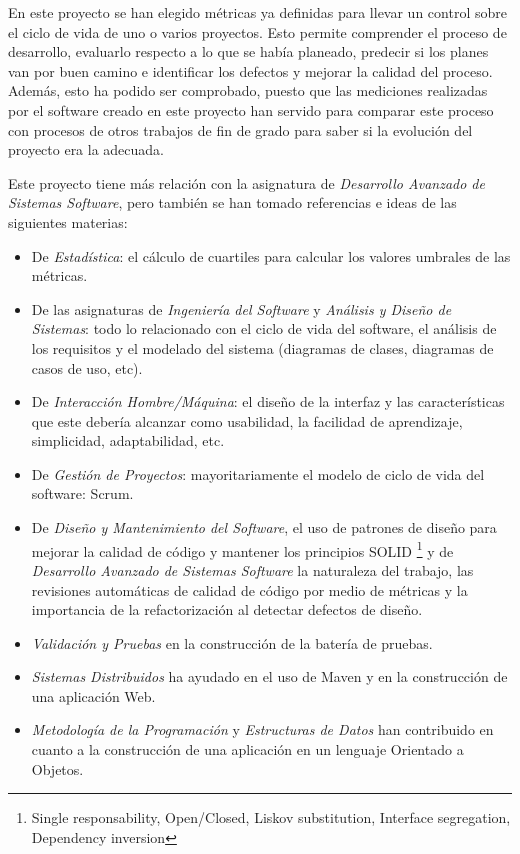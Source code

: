 En este proyecto se han elegido métricas ya definidas para llevar un control sobre el ciclo de vida de uno o varios proyectos. Esto permite comprender el proceso de desarrollo, evaluarlo respecto a lo que se había planeado, predecir si los planes van por buen camino e identificar los defectos y mejorar la calidad del proceso. Además, esto ha podido ser comprobado, puesto que las mediciones realizadas por el software creado en este proyecto han servido para comparar este proceso con procesos de otros trabajos de fin de grado para saber si la evolución del proyecto era la adecuada.

Este proyecto tiene más relación con la asignatura de \textit{Desarrollo Avanzado de Sistemas Software}, pero también se han tomado referencias e ideas de las siguientes materias: 
\begin{itemize}
	\tightlist
	\item De \textit{Estadística}: el cálculo de cuartiles para calcular los valores umbrales de las métricas.
	\item De las asignaturas de \textit{Ingeniería del Software} y \textit{Análisis y Diseño de Sistemas}: todo lo relacionado con el ciclo de vida del software, el análisis de los requisitos y el modelado del sistema (diagramas de clases, diagramas de casos de uso, etc).
	\item De \textit{Interacción Hombre/Máquina}:  el diseño de la interfaz y las características que este debería alcanzar como usabilidad, la facilidad de aprendizaje, simplicidad, adaptabilidad, etc.
	\item De \textit{Gestión de Proyectos}: mayoritariamente el modelo de ciclo de vida del software: Scrum.
	\item De \textit{Diseño y Mantenimiento del Software}, el uso de patrones de diseño para mejorar la calidad de código y mantener los principios SOLID  \footnote{Single responsability, Open/Closed, Liskov substitution, Interface segregation, Dependency inversion} y de \textit{Desarrollo Avanzado de Sistemas Software} la naturaleza del trabajo, las revisiones automáticas de calidad de código por medio de métricas y la importancia de la refactorización al detectar defectos de diseño.
	\item \textit{Validación y Pruebas} en la construcción de la batería de pruebas.
	\item \textit{Sistemas Distribuidos} ha ayudado en el uso de Maven y en la construcción de una aplicación Web.
	\item \textit{Metodología de la Programación} y \textit{Estructuras de Datos} han contribuido en cuanto a la construcción de una aplicación en un lenguaje Orientado a Objetos.
\end{itemize}

